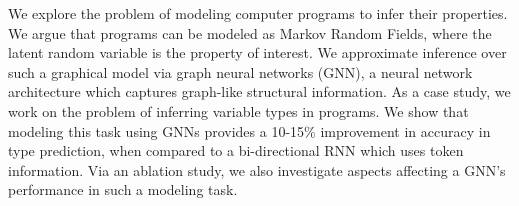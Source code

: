 We explore the problem of modeling computer programs to infer their properties. We argue that programs can be modeled as Markov Random Fields, where the latent random variable is the property of interest. We approximate inference over such a graphical model via graph neural networks (GNN), a neural network architecture which captures graph-like structural information. As a case study, we work on the problem of inferring variable types in programs. We show that modeling this task using GNNs provides a 10-15\% improvement in accuracy in type prediction, when compared to a bi-directional RNN which uses token information. Via an ablation study, we also investigate aspects affecting a GNN's performance in such a modeling task.

